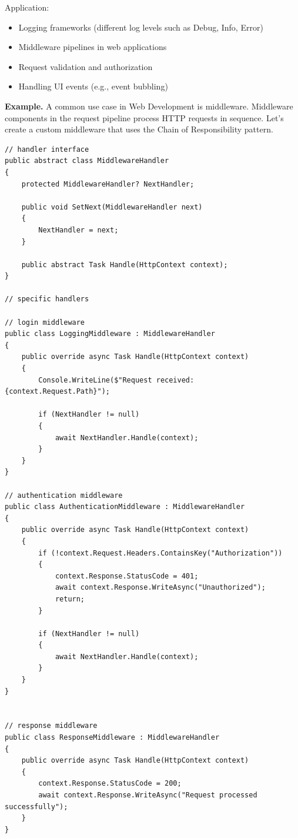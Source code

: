 Application:

\begin{itemize}
\item Logging frameworks (different log levels such as Debug, Info, Error)

\item Middleware pipelines in web applications

\item Request validation and authorization

\item Handling UI events (e.g., event bubbling)
\end{itemize}

\textbf{Example.} A common use case in Web Development is middleware. Middleware components in the request pipeline process HTTP requests in sequence. Let's create a custom middleware that uses the Chain of Responsibility pattern.

\begin{lstlisting}
// handler interface
public abstract class MiddlewareHandler
{
    protected MiddlewareHandler? NextHandler;

    public void SetNext(MiddlewareHandler next)
    {
        NextHandler = next;
    }

    public abstract Task Handle(HttpContext context);
}

// specific handlers

// login middleware
public class LoggingMiddleware : MiddlewareHandler
{
    public override async Task Handle(HttpContext context)
    {
        Console.WriteLine($"Request received: {context.Request.Path}");

        if (NextHandler != null)
        {
            await NextHandler.Handle(context);
        }
    }
}

// authentication middleware
public class AuthenticationMiddleware : MiddlewareHandler
{
    public override async Task Handle(HttpContext context)
    {
        if (!context.Request.Headers.ContainsKey("Authorization"))
        {
            context.Response.StatusCode = 401;
            await context.Response.WriteAsync("Unauthorized");
            return;
        }

        if (NextHandler != null)
        {
            await NextHandler.Handle(context);
        }
    }
}


// response middleware
public class ResponseMiddleware : MiddlewareHandler
{
    public override async Task Handle(HttpContext context)
    {
        context.Response.StatusCode = 200;
        await context.Response.WriteAsync("Request processed successfully");
    }
}
\end{lstlisting}







